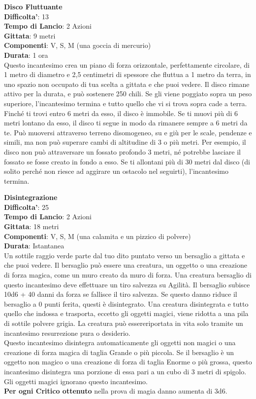 \begin{multicols}{2}
\medskip\textbf{Disco Fluttuante}\\
\textbf{Difficolta'}: 13\\
\textbf{Tempo di Lancio}: 2 Azioni\\
\textbf{Gittata}: 9 metri\\
\textbf{Componenti}: V, S, M (una goccia di mercurio)\\
\textbf{Durata}: 1 ora\\
Questo incantesimo crea un piano di forza orizzontale, perfettamente circolare, di 1 metro di diametro e 2,5 centimetri di spessore che fluttua a 1 metro da terra, in uno spazio non occupato di tua scelta a gittata e che puoi vedere. Il disco rimane attivo per la durata, e può sostenere 250 chili. Se gli viene poggiato sopra un peso superiore, l’incantesimo termina e tutto quello che vi si trova sopra cade a terra. Finché ti trovi entro 6 metri da esso, il disco è immobile. Se ti muovi più di 6 metri lontano da esso, il disco ti segue in modo da rimanere sempre a 6 metri da te. Può muoversi attraverso terreno disomogeneo, su e giù per le scale, pendenze e simili, ma non può superare cambi di altitudine di 3 o più metri. Per esempio, il disco non può attraversare un fossato profondo 3 metri, né potrebbe lasciare il fossato se fosse creato in fondo a esso. Se ti allontani più di 30 metri dal disco (di solito perché non riesce ad aggirare un ostacolo nel seguirti), l’incantesimo termina.

\medskip\textbf{Disintegrazione}\\
\textbf{Difficolta'}: 25\\
\textbf{Tempo di Lancio}: 2 Azioni\\
\textbf{Gittata}: 18 metri\\
\textbf{Componenti}: V, S, M (una calamita e un pizzico di polvere)\\
\textbf{Durata}: Istantanea\\
Un sottile raggio verde parte dal tuo dito puntato verso un bersaglio a gittata e che puoi vedere. Il bersaglio può essere una creatura, un oggetto o una creazione di forza magica, come un muro creato da muro di forza. Una creatura bersaglio di questo incantesimo deve effettuare un tiro salvezza su Agilità. Il bersaglio subisce 10d6 + 40 danni da forza se fallisce il tiro salvezza. Se questo danno riduce il bersaglio a 0 punti ferita, questi è disintegrato. Una creatura disintegrata e tutto quello che indossa e trasporta, eccetto gli oggetti magici, viene ridotta a una pila di sottile polvere grigia. La creatura può essereriportata in vita solo  tramite un incantesimo resurrezione pura o desiderio.\\
Questo incantesimo disintegra automaticamente gli oggetti non magici o una creazione di forza magica di taglia Grande o più piccola. Se il bersaglio è un oggetto non magico o una creazione di forza di taglia Enorme o più grossa, questo incantesimo disintegra una porzione di essa pari a un cubo di 3 metri di spigolo. Gli oggetti magici ignorano questo incantesimo.\\
\textbf{Per ogni Critico ottenuto} nella prova di magia danno aumenta di 3d6.


\end{multicols}
